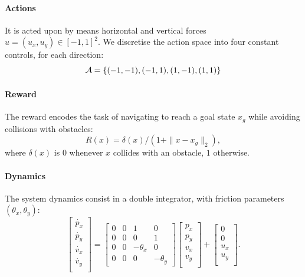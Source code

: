 \documentclass{article}
\begin{document}
\paragraph{Actions}

It is acted upon by means horizontal and vertical forces $u=(u_x, u_y)\in [-1,1]^2$.
We discretise the action space into four constant controls, for each direction:
\begin{equation*}
\mathcal{A} = \{(-1, -1), (-1, 1), (1, -1), (1, 1)\}
\end{equation*}

\paragraph{Reward}

The reward encodes the task of navigating to reach a goal state $x_g$ while avoiding collisions with obstacles: $$R(x) = \delta(x)/(1 + \|x - x_g\|_2),$$  where $\delta(x)$ is $0$ whenever $x$ collides with an obstacle, $1$ otherwise.

\paragraph{Dynamics}
The system dynamics consist in a double integrator, with friction parameters $(\theta_x, \theta_y)$:
$$
\begin{bmatrix}
\dot{p_x}\\
\dot{p_y}\\
\dot{v_x}\\
\dot{v_y}\\
\end{bmatrix} = 
\begin{bmatrix}
0 & 0 & 1 & 0 \\
0 & 0 & 0 & 1 \\
0 & 0 & -\theta_x & 0 \\
0 & 0 & 0 & -\theta_y
\end{bmatrix}
\begin{bmatrix}
{p_x}\\
{p_y}\\
{v_x}\\
{v_y}\\
\end{bmatrix}
+
\begin{bmatrix}
0\\
0\\
{u_x}\\
{u_y}\\
\end{bmatrix}.
$$
\end{document}
